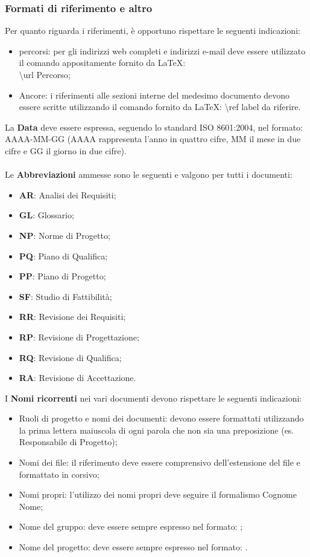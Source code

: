 {{		\subsubsection{Formati di riferimento e altro}{
			\label{sub:rif}
			Per quanto riguarda i riferimenti, è opportuno rispettare le seguenti indicazioni:
			\begin{itemize}
				\item percorsi: per gli indirizzi\ped{g} web completi e indirizzi e-mail deve essere utilizzato il comando appositamente fornito da \LaTeX:\\ \textbackslash url \textbraceleft Percorso\textbraceright;
				\item Ancore: i riferimenti alle sezioni interne del medesimo documento devono essere scritte utilizzando il comando fornito da \LaTeX: \textbackslash ref \textbraceleft label da riferire\textbraceright .
			\end{itemize}
			La \textbf{Data} deve essere espressa, seguendo lo standard ISO 8601:2004, nel formato: AAAA-MM-GG (AAAA rappresenta l'anno in quattro cifre, MM il mese in due cifre e GG il giorno in due cifre).\\
			\\
			Le \textbf{Abbreviazioni} ammesse sono le seguenti e valgono per tutti i documenti:
			\begin{itemize}
				\item \textbf{AR}: Analisi dei Requisiti;
				\item \textbf{GL}: Glossario;
				\item \textbf{NP}: Norme di Progetto;
				\item \textbf{PQ}: Piano di Qualifica;
				\item \textbf{PP}: Piano di Progetto;
				\item \textbf{SF}: Studio di Fattibilità;
				\item \textbf{RR}: Revisione dei Requisiti;
				\item \textbf{RP}: Revisione di Progettazione;
				\item \textbf{RQ}: Revisione di Qualifica;
				\item \textbf{RA}: Revisione di Accettazione.
			\end{itemize}
			I \textbf{Nomi ricorrenti} nei vari documenti devono rispettare le seguenti indicazioni:
			\begin{itemize}
				\item Ruoli di progetto e nomi dei documenti: devono essere formattati utilizzando la prima lettera maiuscola di ogni parola che non sia una preposizione (es. Responsabile di Progetto);
				\item Nomi dei file: il riferimento deve essere comprensivo dell’estensione\ped{g} del file e formattato in corsivo;
				\item Nomi propri: l’utilizzo dei nomi propri deve seguire il formalismo Cognome Nome;
				\item Nome del gruppo: deve essere sempre espresso nel formato: \gruppo;
				\item Nome del progetto: deve essere sempre espresso nel formato: \premi.
			\end{itemize}
			}
}}
